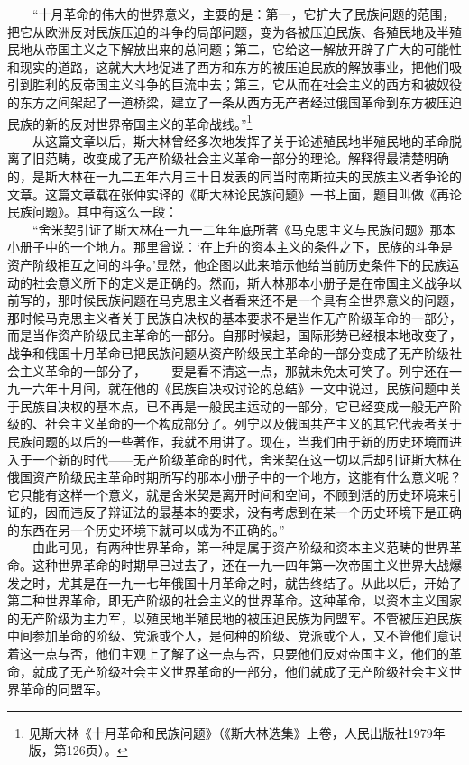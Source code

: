 \documentclass[cn,11pt,chinese]{elegantbook}
\begin{document}
　　“十月革命的伟大的世界意义，主要的是：第一，它扩大了民族问题的范围，把它从欧洲反对民族压迫的斗争的局部问题，变为各被压迫民族、各殖民地及半殖民地从帝国主义之下解放出来的总问题；第二，它给这一解放开辟了广大的可能性和现实的道路，这就大大地促进了西方和东方的被压迫民族的解放事业，把他们吸引到胜利的反帝国主义斗争的巨流中去；第三，它从而在社会主义的西方和被奴役的东方之间架起了一道桥梁，建立了一条从西方无产者经过俄国革命到东方被压迫民族的新的反对世界帝国主义的革命战线。”\footnote[12]{ 见斯大林《十月革命和民族问题》（《斯大林选集》上卷，人民出版社1979年版，第126页）。}\\
　　从这篇文章以后，斯大林曾经多次地发挥了关于论述殖民地半殖民地的革命脱离了旧范畴，改变成了无产阶级社会主义革命一部分的理论。解释得最清楚明确的，是斯大林在一九二五年六月三十日发表的同当时南斯拉夫的民族主义者争论的文章。这篇文章载在张仲实译的《斯大林论民族问题》一书上面，题目叫做《再论民族问题》。其中有这么一段：\\
　　“舍米契引证了斯大林在一九一二年年底所著《马克思主义与民族问题》那本小册子中的一个地方。那里曾说：‘在上升的资本主义的条件之下，民族的斗争是资产阶级相互之间的斗争。’显然，他企图以此来暗示他给当前历史条件下的民族运动的社会意义所下的定义是正确的。然而，斯大林那本小册子是在帝国主义战争以前写的，那时候民族问题在马克思主义者看来还不是一个具有全世界意义的问题，那时候马克思主义者关于民族自决权的基本要求不是当作无产阶级革命的一部分，而是当作资产阶级民主革命的一部分。自那时候起，国际形势已经根本地改变了，战争和俄国十月革命已把民族问题从资产阶级民主革命的一部分变成了无产阶级社会主义革命的一部分了，——要是看不清这一点，那就未免太可笑了。列宁还在一九一六年十月间，就在他的《民族自决权讨论的总结》一文中说过，民族问题中关于民族自决权的基本点，已不再是一般民主运动的一部分，它已经变成一般无产阶级的、社会主义革命的一个构成部分了。列宁以及俄国共产主义的其它代表者关于民族问题的以后的一些著作，我就不用讲了。现在，当我们由于新的历史环境而进入于一个新的时代——无产阶级革命的时代，舍米契在这一切以后却引证斯大林在俄国资产阶级民主革命时期所写的那本小册子中的一个地方，这能有什么意义呢？它只能有这样一个意义，就是舍米契是离开时间和空间，不顾到活的历史环境来引证的，因而违反了辩证法的最基本的要求，没有考虑到在某一个历史环境下是正确的东西在另一个历史环境下就可以成为不正确的。”\\
　　由此可见，有两种世界革命，第一种是属于资产阶级和资本主义范畴的世界革命。这种世界革命的时期早已过去了，还在一九一四年第一次帝国主义世界大战爆发之时，尤其是在一九一七年俄国十月革命之时，就告终结了。从此以后，开始了第二种世界革命，即无产阶级的社会主义的世界革命。这种革命，以资本主义国家的无产阶级为主力军，以殖民地半殖民地的被压迫民族为同盟军。不管被压迫民族中间参加革命的阶级、党派或个人，是何种的阶级、党派或个人，又不管他们意识着这一点与否，他们主观上了解了这一点与否，只要他们反对帝国主义，他们的革命，就成了无产阶级社会主义世界革命的一部分，他们就成了无产阶级社会主义世界革命的同盟军。\\
\end{document}
